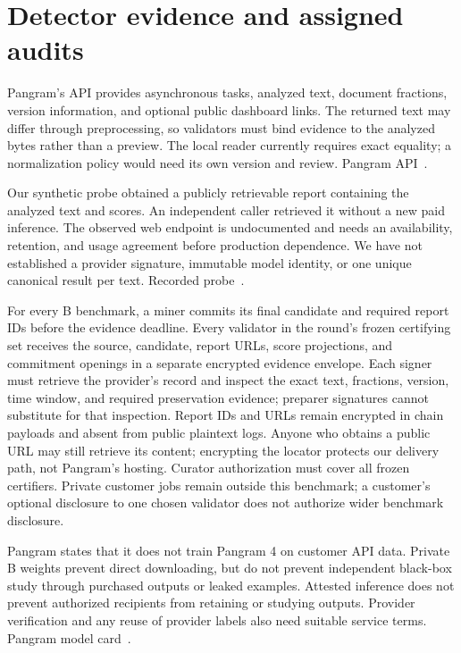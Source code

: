 \section{Detector evidence and assigned
audits}\label{pangram-evidence-and-assigned-audits}

Pangram's API provides asynchronous tasks, analyzed text, document
fractions, version information, and optional public dashboard links. The
returned text may differ through preprocessing, so validators must bind
evidence to the analyzed bytes rather than a preview. The local reader
currently requires exact equality; a normalization policy would need its
own version and review.
Pangram API~\cite{pangramapi}.

Our synthetic probe obtained a publicly retrievable report containing
the analyzed text and scores. An independent caller retrieved it without
a new paid inference. The observed web endpoint is undocumented and
needs an availability, retention, and usage agreement before production
dependence. We have not established a provider signature, immutable
model identity, or one unique canonical result per text.
Recorded probe~\cite{reportprobe}.

For every B benchmark, a miner commits its final candidate and
required report IDs before the evidence deadline. Every validator in the
round's frozen certifying set receives the source, candidate, report URLs,
score projections, and commitment openings in a separate encrypted evidence
envelope. Each signer must retrieve the provider's record and inspect the exact
text, fractions, version, time window, and required preservation evidence;
preparer signatures cannot substitute for that inspection. Report IDs and
URLs remain encrypted in chain payloads and absent from public plaintext
logs. Anyone who obtains a public URL may still retrieve its content;
encrypting the locator protects our delivery path, not Pangram's hosting.
Curator authorization must cover all frozen certifiers. Private customer
jobs remain outside this benchmark; a customer's optional disclosure to
one chosen validator does not authorize wider benchmark disclosure.

Pangram states that it does not train Pangram 4 on customer API data.
Private B weights prevent direct downloading, but do not prevent
independent black-box study through purchased outputs or leaked
examples. Attested inference does not prevent authorized recipients from retaining
or studying outputs.
Provider verification
and any reuse of provider labels also need suitable service terms.
Pangram model card~\cite{pangramcard}.

